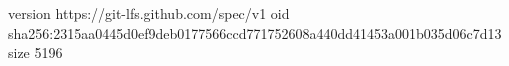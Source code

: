 version https://git-lfs.github.com/spec/v1
oid sha256:2315aa0445d0ef9deb0177566ccd771752608a440dd41453a001b035d06c7d13
size 5196
